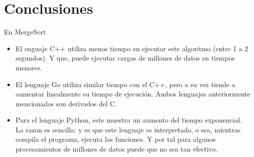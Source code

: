 \documentclass{article}
\begin{document}
\section{Conclusiones}
En MergeSort 
    \begin{itemize}
        \item El enguaje C++ utiliza menos tiempo en ejecutar este algoritmo (entre 1 a 2 segundos). Y que, puede ejecutar cargas de millones de datos en tiempos menores. 
        \item El lenguaje Go utiliza similar tiempo con el C++, pero a su vez tiende a aumentar linealmente su tiempo de ejecución. Ambos lenguajes anteriormente mencionados son derivados del C.
        \item Para el lenguaje Python, este muestra un aumento del tiempo exponencial. La razon es sencilla: y es que este lenguaje es interpretado, o sea, mientras compila el programa, ejecuta las funciones. Y por tal para algunos procesamientos de millones de datos puede que no sea tan efectivo.
        
    \end{itemize}
\end{document}
